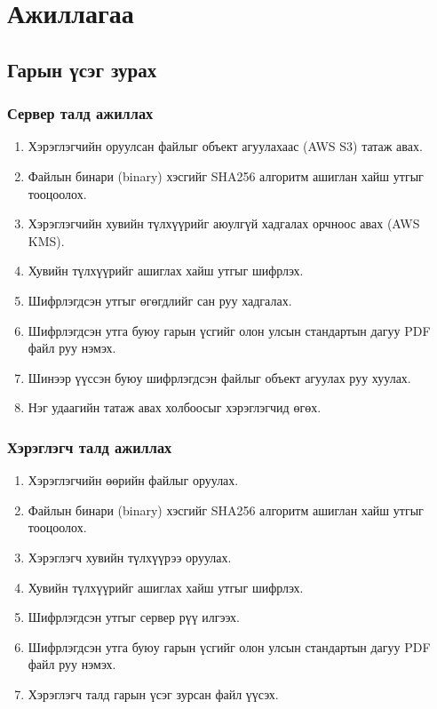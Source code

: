 \section{Ажиллагаа}
\subsection{Гарын үсэг зурах}
\subsubsection{Сервер талд ажиллах}
\begin{enumerate}
	\item Хэрэглэгчийн оруулсан файлыг объект агуулахаас (AWS S3) татаж авах.
	\item Файлын бинари (binary) хэсгийг SHA256 алгоритм ашиглан хайш утгыг тооцоолох.
	\item Хэрэглэгчийн хувийн түлхүүрийг аюулгүй хадгалах орчноос авах (AWS KMS).
	\item Хувийн түлхүүрийг ашиглах хайш утгыг шифрлэх.
	\item Шифрлэгдсэн утгыг өгөгдлийг сан руу хадгалах.
	\item Шифрлэгдсэн утга буюу гарын үсгийг олон улсын стандартын дагуу PDF файл руу нэмэх.
	\item Шинээр үүссэн буюу шифрлэгдсэн файлыг объект агуулах руу хуулах.
	\item Нэг удаагийн татаж авах холбоосыг хэрэглэгчид өгөх.
\end{enumerate}
\subsubsection{Хэрэглэгч талд ажиллах}
\begin{enumerate}
	\item Хэрэглэгчийн өөрийн файлыг оруулах.
	\item Файлын бинари (binary) хэсгийг SHA256 алгоритм ашиглан хайш утгыг тооцоолох.
	\item Хэрэглэгч хувийн түлхүүрээ оруулах.
	\item Хувийн түлхүүрийг ашиглах хайш утгыг шифрлэх.
	\item Шифрлэгдсэн утгыг сервер рүү илгээх.
	\item Шифрлэгдсэн утга буюу гарын үсгийг олон улсын стандартын дагуу PDF файл руу нэмэх.
	\item Хэрэглэгч талд гарын үсэг зурсан файл үүсэх.
\end{enumerate}

